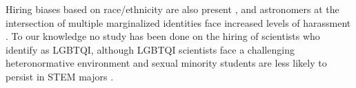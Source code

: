 \documentclass[modern]{aastex62}
\begin{document}
Hiring biases based on race/ethnicity are also present \citep{ber04,gib16}, and astronomers at the intersection of multiple marginalized identities face increased levels of harassment \citep{cla17}. To our knowledge no study has been done on the hiring of scientists who identify as LGBTQI, although LGBTQI scientists face a challenging heteronormative environment \citep{cec11,ath16,yod16} and sexual minority students are less likely to persist in STEM majors \citep{hug18}.



\end{document}
